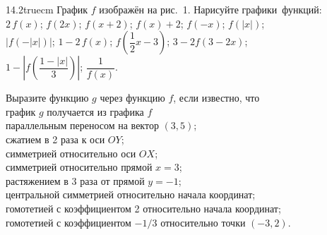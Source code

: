 \documentclass[a4paper,12pt]{article}
\begin{document}

{\hsize 14.2truecm
График %
$f$ %
изображ\"ен на рис.~1.
Нарисуйте %
графики~\hbox{функций:}\\
   $2\,f(x)$;
   $f(2x)$;
   $f(x+2)$;
   $f(x)+2$;
   $f(-x)$;
   $f(|x|)$;\\
   $|f(-|x|)|$;
   $1-2\,f(x)$;
   $f\left(\dfrac{1}2 x-3\right)$;
   $3-2f(3-2x)$;\\
   $1-\left|f\left(\dfrac{1-|x|}3\right)\right|$;
   $\dfrac1{f(x)}$.





Выразите функцию $g$ через функцию $f$, если известно, что\\
график $g$ получается из графика $f$\\
 параллельным переносом на вектор $(3,5)$;\\
 сжатием в 2 раза к оси $OY$;\\
  симметрией относительно оси $OX$;\\
 симметрией относительно прямой $x=3$;\\
 растяжением в 3 раза от прямой $y=-1$;\\
 центральной симметрией относительно начала координат;\\
 гомотетией с коэффициентом 2 относительно начала координат;\\
 гомотетией с коэффициентом $-1/3$ относительно точки $(-3,2)$.


}




\end{document}
